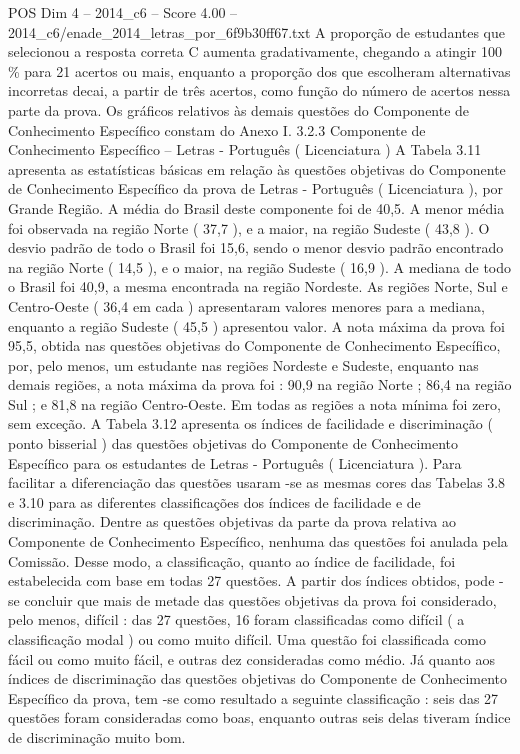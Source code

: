 \begin{textsample}{POS Dim 4 – 2014\_c6 – Score 4.00 – 2014\_c6/enade\_2014\_letras\_por\_6f9b30ff67.txt}
A proporção de estudantes que selecionou a resposta correta C aumenta gradativamente, chegando a atingir 100 \% para 21 acertos ou mais, enquanto a proporção dos que escolheram alternativas incorretas decai, a partir de três acertos, como função do número de acertos nessa parte da prova.
Os gráficos relativos às demais questões do Componente de Conhecimento Específico constam do Anexo I. 3.2.3 Componente de Conhecimento Específico – Letras - Português ( Licenciatura ) A Tabela 3.11 apresenta as estatísticas básicas em relação às questões objetivas do Componente de Conhecimento Específico da prova de Letras - Português ( Licenciatura ), por Grande Região.
A média do Brasil deste componente foi de 40,5.
A menor média foi observada na região Norte ( 37,7 ), e a maior, na região Sudeste ( 43,8 ).
O desvio padrão de todo o Brasil foi 15,6, sendo o menor desvio padrão encontrado na região Norte ( 14,5 ), e o maior, na região Sudeste ( 16,9 ).
A mediana de todo o Brasil foi 40,9, a mesma encontrada na região Nordeste.
As regiões Norte, Sul e Centro-Oeste ( 36,4 em cada ) apresentaram valores menores para a mediana, enquanto a região Sudeste ( 45,5 ) apresentou valor.
A nota máxima da prova foi 95,5, obtida nas questões objetivas do Componente de Conhecimento Específico, por, pelo menos, um estudante nas regiões Nordeste e Sudeste, enquanto nas demais regiões, a nota máxima da prova foi : 90,9 na região Norte ; 86,4 na região Sul ; e 81,8 na região Centro-Oeste.
Em todas as regiões a nota mínima foi zero, sem exceção.
A Tabela 3.12 apresenta os índices de facilidade e discriminação ( ponto bisserial ) das questões objetivas do Componente de Conhecimento Específico para os estudantes de Letras - Português ( Licenciatura ).
Para facilitar a diferenciação das questões usaram -se as mesmas cores das Tabelas 3.8 e 3.10 para as diferentes classificações dos índices de facilidade e de discriminação.
Dentre as questões objetivas da parte da prova relativa ao Componente de Conhecimento Específico, nenhuma das questões foi anulada pela Comissão.
Desse modo, a classificação, quanto ao índice de facilidade, foi estabelecida com base em todas 27 questões.
A partir dos índices obtidos, pode -se concluir que mais de metade das questões objetivas da prova foi considerado, pelo menos, difícil : das 27 questões, 16 foram classificadas como difícil ( a classificação modal ) ou como muito difícil.
Uma questão foi classificada como fácil ou como muito fácil, e outras dez consideradas como médio.
Já quanto aos índices de discriminação das questões objetivas do Componente de Conhecimento Específico da prova, tem -se como resultado a seguinte classificação : seis das 27 questões foram consideradas como boas, enquanto outras seis delas tiveram índice de discriminação muito bom.

\end{textsample}
